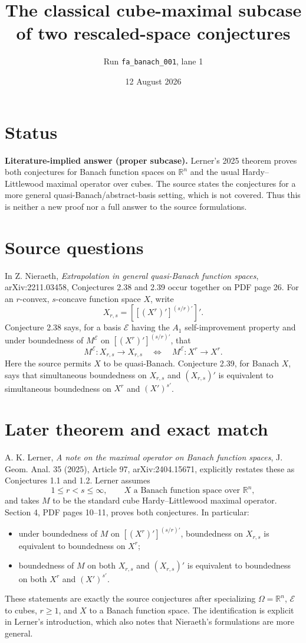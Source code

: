 \documentclass[11pt]{article}
\title{The classical cube-maximal subcase of two rescaled-space conjectures}
\author{Run \texttt{fa\_banach\_001}, lane 1}
\date{12 August 2026}
\newcommand{\R}{\mathbb R}
\begin{document}
\maketitle

\section*{Status}

\textbf{Literature-implied answer (proper subcase).}
Lerner's 2025 theorem proves both conjectures for Banach function spaces on
$\R^n$ and the usual Hardy--Littlewood maximal operator over cubes.  The source
states the conjectures for a more general quasi-Banach/abstract-basis setting,
which is not covered.  Thus this is neither a new proof nor a full answer to
the source formulations.

\section*{Source questions}

In Z. Nieraeth, \emph{Extrapolation in general quasi-Banach function spaces},
arXiv:2211.03458, Conjectures 2.38 and 2.39 occur together on PDF page 26.
For an $r$-convex, $s$-concave function space $X$, write
\[
 X_{r,s}=\left[\left[(X^r)'\right]^{(s/r)'}\right]'.
\]
Conjecture 2.38 says, for a basis $\mathcal E$ having the $A_1$
self-improvement property and under boundedness of
$M^{\mathcal E}$ on $[(X^r)']^{(s/r)'}$, that
\[
 M^{\mathcal E}:X_{r,s}\to X_{r,s}
 \quad\Longleftrightarrow\quad
 M^{\mathcal E}:X^r\to X^r.
\]
Here the source permits $X$ to be quasi-Banach.  Conjecture 2.39, for Banach
$X$, says that simultaneous boundedness on $X_{r,s}$ and $(X_{r,s})'$ is
equivalent to simultaneous boundedness on $X^r$ and $(X')^{s'}$.

\section*{Later theorem and exact match}

A. K. Lerner, \emph{A note on the maximal operator on Banach function spaces},
J. Geom. Anal. 35 (2025), Article 97, arXiv:2404.15671, explicitly restates
these as Conjectures 1.1 and 1.2.  Lerner assumes
\[
 1\le r<s\le\infty,\qquad X\text{ a Banach function space over }\R^n,
\]
and takes $M$ to be the standard cube Hardy--Littlewood maximal operator.
Section 4, PDF pages 10--11, proves both conjectures.  In particular:
\begin{itemize}
\item under boundedness of $M$ on $[(X^r)']^{(s/r)'}$, boundedness on
  $X_{r,s}$ is equivalent to boundedness on $X^r$;
\item boundedness of $M$ on both $X_{r,s}$ and $(X_{r,s})'$ is equivalent to
  boundedness on both $X^r$ and $(X')^{s'}$.
\end{itemize}
These statements are exactly the source conjectures after specializing
$\Omega=\R^n$, $\mathcal E$ to cubes, $r\ge1$, and $X$ to a Banach function
space.  The identification is explicit in Lerner's introduction, which also
notes that Nieraeth's formulations are more general.
\end{document}
